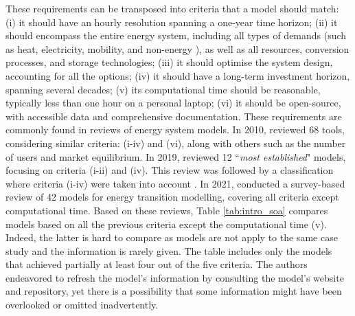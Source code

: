 These requirements can be transposed into criteria that a model should match:
(i) it should have an hourly resolution spanning a one-year time horizon;
(ii) it should encompass the entire energy system, including all types of demands (such as heat, electricity, mobility, and non-energy
), as well as all resources, conversion processes, and storage technologies;
(iii) it should optimise the system design, accounting for all the options;
(iv) it should have a long-term investment horizon, spanning several decades;
(v) its computational time should be reasonable, typically less than one hour on a personal laptop;
(vi) it should be open-source, with accessible data and comprehensive documentation.
These requirements are commonly found in reviews of energy system models. In 2010, \citet{Connolly2010} reviewed 68 tools, considering similar criteria: (i-iv) and (vi), along with others such as the number of users and market equilibrium. In 2019, \citet{prina2019transition} reviewed 12 ``\emph{most established}" models, focusing on criteria (i-ii) and (iv). This review was followed by a classification where criteria (i-iv) were taken into account \cite{prina2020classification}. In 2021, \citet{chang2021trends} conducted a survey-based review of 42 models for energy transition modelling, covering all criteria except computational time.
Based on these reviews, Table \ref{tab:intro_soa} compares models based on all the previous criteria except the computational time (v). Indeed, the latter is hard to compare as models are not apply to the same case study and the information is rarely given. The table includes only the models that achieved partially at least four out of the five criteria. The authors endeavored to refresh the model's information by consulting the model's website and repository, yet there is a possibility that some information might have been overlooked or omitted inadvertently.


